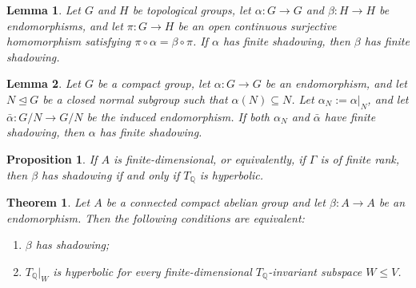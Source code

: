 \documentclass[10pt,a4paper]{amsart}
\newtheorem{theorem}{Theorem}
\newtheorem{lemma}{Lemma}
\newtheorem{proposition}{Proposition}
\begin{document}
\begin{lemma}\label{lem:quotient-shadowing}
Let $G$ and $H$ be topological groups, let $\alpha:G\to G$ and
$\beta:H\to H$ be endomorphisms, and let $\pi:G\to H$ be an open continuous surjective homomorphism satisfying
$\pi\circ\alpha=\beta\circ\pi$. If $\alpha$ has finite shadowing, then
$\beta$ has finite shadowing.
\end{lemma}

\begin{lemma}\label{lem:extension-shadowing}
Let $G$ be a compact group, let $\alpha:G\to G$ be an endomorphism,
and let $N\trianglelefteq G$ be a closed normal subgroup such that
$\alpha(N)\subseteq N$. Let $\alpha_N:=\alpha|_N$, and let
$\bar\alpha:G/N\to G/N$ be the induced endomorphism. If both
$\alpha_N$ and $\bar\alpha$ have finite shadowing, then $\alpha$ has
finite shadowing.
\end{lemma}

\begin{proposition}\label{prop:finite-dim}
If $A$ is finite-dimensional, or equivalently, if $\Gamma$ is of
finite rank, then $\beta$ has shadowing if and only if
$T_{\mathbb Q}$ is hyperbolic.
\end{proposition}

\begin{theorem}\label{thm:abelian-endo-shad}
Let $A$ be a connected compact abelian group and let
$\beta:A\to A$ be an endomorphism. Then the following conditions are
equivalent:
\begin{enumerate}
\item $\beta$ has shadowing;
\item $T_{\mathbb Q}|_W$ is hyperbolic for every finite-dimensional
$T_{\mathbb Q}$-invariant subspace $W\leq V$.
\end{enumerate}
\end{theorem}
\end{document}
